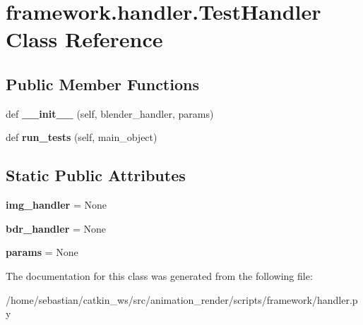 \hypertarget{classframework_1_1handler_1_1TestHandler}{}\section{framework.\+handler.\+Test\+Handler Class Reference}
\label{classframework_1_1handler_1_1TestHandler}
\subsection*{Public Member Functions}
\begin{DoxyCompactItemize}
\item 
def {\bfseries \+\_\+\+\_\+init\+\_\+\+\_\+} (self, blender\+\_\+handler, params)\hypertarget{classframework_1_1handler_1_1TestHandler_a6f18e3baa6fa3a92954e6e0708875d7b}{}\label{classframework_1_1handler_1_1TestHandler_a6f18e3baa6fa3a92954e6e0708875d7b}

\item 
def {\bfseries run\+\_\+tests} (self, main\+\_\+object)\hypertarget{classframework_1_1handler_1_1TestHandler_a58ef43c7711fc2cb673919733f519685}{}\label{classframework_1_1handler_1_1TestHandler_a58ef43c7711fc2cb673919733f519685}

\end{DoxyCompactItemize}
\subsection*{Static Public Attributes}
\begin{DoxyCompactItemize}
\item 
{\bfseries img\+\_\+handler} = None\hypertarget{classframework_1_1handler_1_1TestHandler_a662277fe87ac3c3c954d38c0e5c81625}{}\label{classframework_1_1handler_1_1TestHandler_a662277fe87ac3c3c954d38c0e5c81625}

\item 
{\bfseries bdr\+\_\+handler} = None\hypertarget{classframework_1_1handler_1_1TestHandler_a18b7245d9239b51fdf0fadbc3b8d8421}{}\label{classframework_1_1handler_1_1TestHandler_a18b7245d9239b51fdf0fadbc3b8d8421}

\item 
{\bfseries params} = None\hypertarget{classframework_1_1handler_1_1TestHandler_a31cc2292a31ed4ffd277f5df9f446438}{}\label{classframework_1_1handler_1_1TestHandler_a31cc2292a31ed4ffd277f5df9f446438}

\end{DoxyCompactItemize}


The documentation for this class was generated from the following file\+:\begin{DoxyCompactItemize}
\item 
/home/sebastian/catkin\+\_\+ws/src/animation\+\_\+render/scripts/framework/handler.\+py\end{DoxyCompactItemize}
